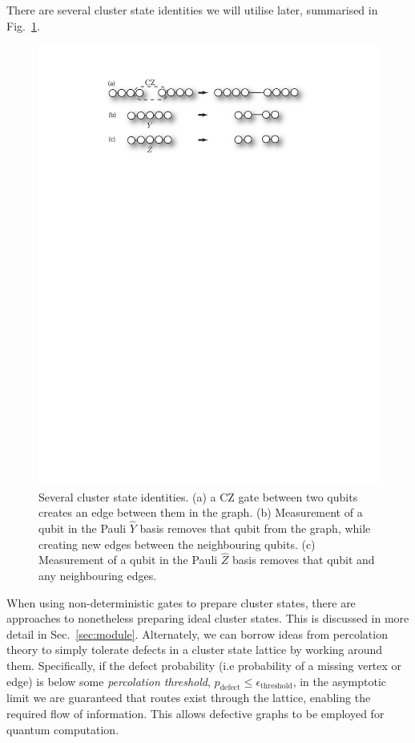 \documentclass[aps, rmp, twocolumn, amsmath, amssymb, nofootinbib, superscriptaddress, longbibliography, floatfix, table-of-contents, eqsecnum]{revtex4-1}
\begin{document}
There are several cluster state identities we will utilise later, summarised in Fig.~\ref{fig:cluster_ident}.

\begin{figure}[!htb]
	\includegraphics[width=\columnwidth]{cluster_identities} 
	\caption{Several cluster state identities. (a) a CZ gate between two qubits creates an edge between them in the graph. (b) Measurement of a qubit in the Pauli $\hat{Y}$ basis removes that qubit from the graph, while creating new edges between the neighbouring qubits. (c) Measurement of a qubit in the Pauli $\hat{Z}$ basis removes that qubit and any neighbouring edges.} \label{fig:cluster_ident} 
\end{figure}

When using non-deterministic gates to prepare cluster states, there are approaches to nonetheless preparing ideal cluster states. This is discussed in more detail in Sec.~\ref{sec:module}. Alternately, we can borrow ideas from percolation theory to simply tolerate defects in a cluster state lattice by working around them. Specifically, if the defect probability (i.e probability of a missing vertex or edge) is below some \textit{percolation threshold}, \mbox{$p_\text{defect}\leq \epsilon_\text{threshold}$}, in the asymptotic limit we are guaranteed that routes exist through the lattice, enabling the required flow of information. This allows defective graphs to be employed for quantum computation.
\end{document}
